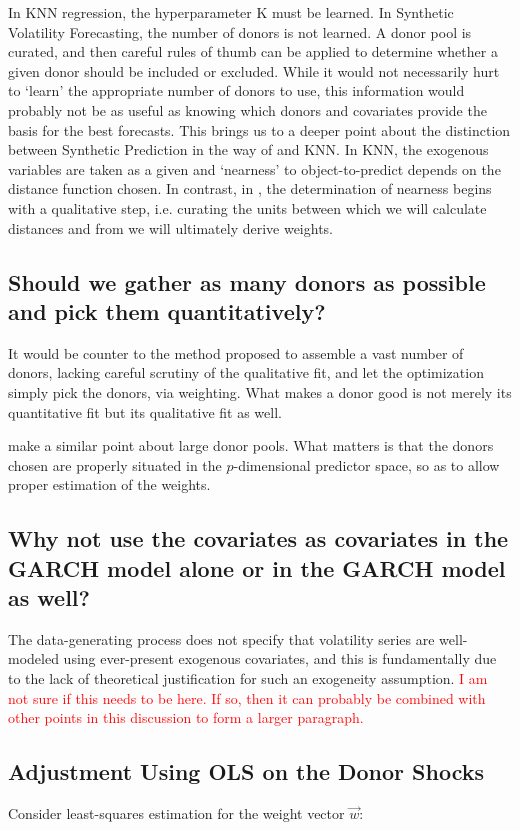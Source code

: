 \documentclass[11pt]{article}
\theoremstyle{definition}
\begin{document}
In KNN regression, the hyperparameter K must be learned.  In Synthetic Volatility Forecasting, the number of donors is not learned.  A donor pool is curated, and then careful rules of thumb can be applied to determine whether a given donor should be included or excluded.  While it would not necessarily hurt to `learn' the appropriate number of donors to use, this information would probably not be as useful as knowing which donors and covariates provide the basis for the best forecasts.  This brings us to a deeper point about the distinction between Synthetic Prediction in the way of \citet{lin2021minimizing} and KNN.  In KNN, the exogenous variables are taken as a given and `nearness' to object-to-predict depends on the distance function chosen.  In contrast, in \citet{lin2021minimizing}, the determination of nearness begins with a qualitative step, i.e. curating the units between which we will calculate distances and from we will ultimately derive weights.

\subsection{Should we gather as many donors as possible and pick them quantitatively?}
It would be counter to the method proposed to assemble a vast number of donors, lacking careful scrutiny of the qualitative fit, and let the optimization simply pick the donors, via weighting.  What makes a donor good is not merely its quantitative fit but its qualitative fit as well.

\citet{abadie2022synthetic} make a similar point about large donor pools.  What matters is that the donors chosen are properly situated in the $p$-dimensional predictor space, so as to allow proper estimation of the weights.

\subsection{Why not use the covariates as covariates in the GARCH model alone or in the GARCH model as well?}
The data-generating process does not specify that volatility series are well-modeled using ever-present exogenous covariates, and this is fundamentally due to the lack of theoretical justification for such an exogeneity assumption. \textcolor{red}{I am not sure if this needs to be here. If so, then it can probably be combined with other points in this discussion to form a larger paragraph.}

\subsection{Adjustment Using OLS on the Donor Shocks}
Consider least-squares estimation for the weight vector $\vec{w}$:
\end{document}
